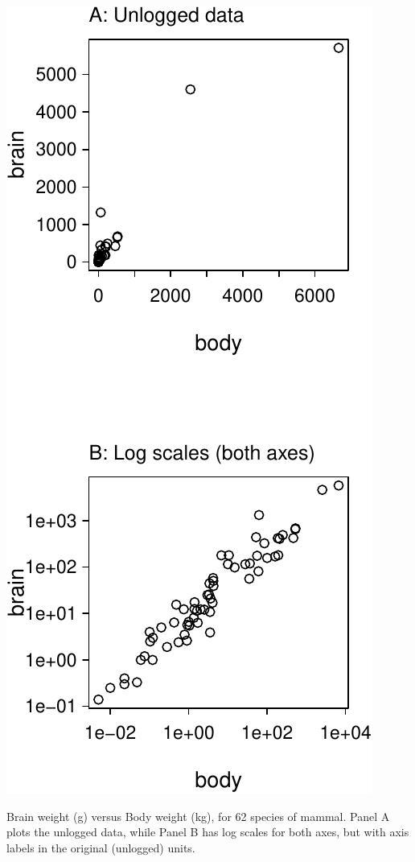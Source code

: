 \begin{marginfigure}
\begin{Schunk}
\centerline{\includegraphics[width=\textwidth]{figs/03-bbAB-1} }

\end{Schunk}
\caption{Brain weight (g) versus Body weight (kg), for 62 species of mammal.
Panel A plots the unlogged data, while Panel B has log scales for
both axes, but with axis labels in the original (unlogged) units.
  \label{fig:Animals}}
\end{marginfigure}


